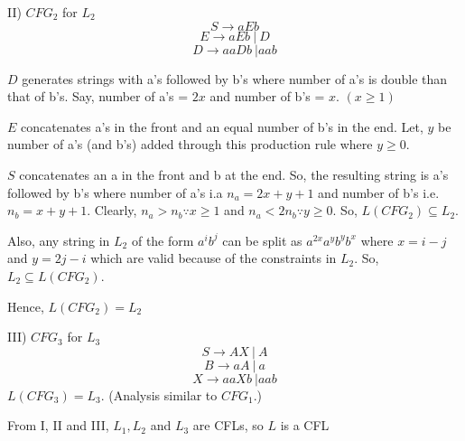 \documentclass{article}
\begin{document}
    II) $CFG_2$ for $L_2$
    $$S \rightarrow aEb$$
    $$E \rightarrow aEb\ |\ D$$
    $$D \rightarrow aaDb\ | aab$$
    
    \quad $D$ generates strings with a's followed by b's where number of a's is double than that of b's. Say, number of a's = $2x$ and number of b's = $x$. $(x \geq 1)$
    
    \quad $E$ concatenates a's in the front and an equal number of b's in the end. Let, $y$ be number of a's (and b's) added through this production rule where $y \geq 0$.
    
    \quad $S$ concatenates an a in the front and b at the end. So, the resulting string is a's followed by b's where number of a's i.a $n_a = 2x+ y + 1$ and number of b's  i.e. $n_b = x + y + 1$. Clearly, $n_a > n_b \because x \geq 1$ and $n_a < 2n_b \because y \geq 0$. So, $L(CFG_2) \subseteq L_2$. 
    
    \quad Also, any string in $L_2$ of the form $a^ib^j$ can be split as $a^{2x}a^yb^yb^x$ where $x = i-j$ and $y = 2j - i$ which are valid because of the constraints in $L_2$. So,  $L_2 \subseteq L(CFG_2)$.
    
    \quad Hence, $L(CFG_2) = L_2$
    
    III) $CFG_3$ for $L_3$
    $$S \rightarrow AX\ | \ A$$
    $$B \rightarrow aA\ |\ a$$
    $$X \rightarrow aaXb\ | aab$$
    \quad $L(CFG_3)  = L_3$. (Analysis similar to $CFG_1$.)
    
    From I, II and III, $L_1, L_2$ and $L_3$ are CFLs, so $L$ is a CFL
    
\end{document}
